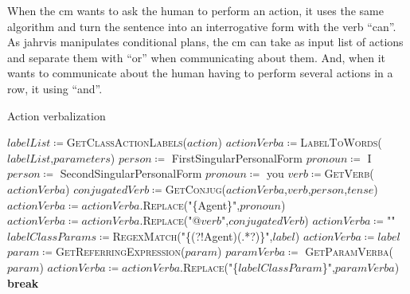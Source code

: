 \documentclass[a4paper,11pt,twoside]{StyleThese}
\begin{document}
When the \acrshort{cm} wants to ask the human to perform an action, it uses the same algorithm and turn the sentence into an interrogative form with the verb ``can''. As \acrshort{jahrvis} manipulates conditional plans, the \acrshort{cm} can take as input list of actions and separate them with ``or'' when communicating about them. And, when it wants to communicate about the human having to perform several actions in a row, it using ``and''.
 
\begin{algorithm}[!htb]
	\caption{Action verbalization}
	\label{chap2:algo:action_verba}
	\begin{algorithmic}
	\State $labelList \coloneqq$\textsc{GetClassActionLabels($action$)}
	\State $actionVerba \coloneqq$\textsc{LabelToWords}($labelList$,$parameters$)
		\State $person \coloneqq$ FirstSingularPersonalForm
		\State $pronoun \coloneqq$ I
		\State $person \coloneqq$ SecondSingularPersonalForm
		\State $pronoun \coloneqq$ you
	\EndIf
	\State $verb \coloneqq$\textsc{GetVerb}($actionVerba$)
	\State $conjugatedVerb \coloneqq$\textsc{GetConjug}($actionVerba$,$verb$,$person$,$tense$)
	\State $actionVerba \coloneqq actionVerba.$\textsc{Replace}("\{Agent\}",$pronoun$)
	\State $actionVerba \coloneqq actionVerba.$\textsc{Replace}("@$verb$",$conjugatedVerb$)
	\EndFunction
	\Statex
	\State $actionVerba \coloneqq$""
		\State $labelClassParams \coloneqq$\textsc{RegexMatch}("\{(?!Agent)(.*?)\}",$label$)
			 
					\State $actionVerba \coloneqq label$
				\EndIf
					\State $param \coloneqq$\textsc{GetReferringExpression($param$)}
				\Else
					\State $paramVerba \coloneqq$ \textsc{GetParamVerba($param$)}
				\EndIf
				\State $actionVerba \coloneqq actionVerba.$\textsc{Replace}("\{$labelClassParam$\}",$paramVerba$)
				\State \textbf{break}
			\EndIf
			\EndFor
		\EndFor
		\EndIf
	\EndFor
	\EndFunction
	\end{algorithmic}
\end{algorithm}	
	
\end{document}
